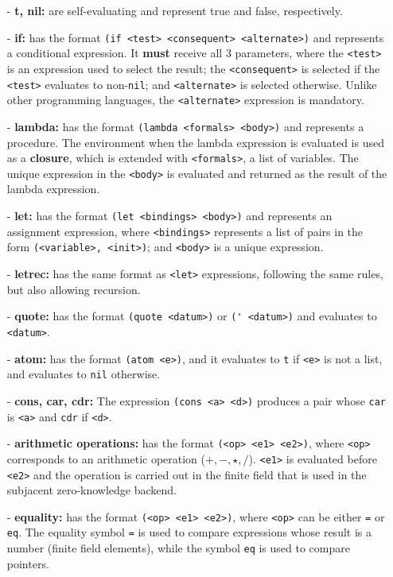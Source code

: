 \documentclass[10pt, english]{article}
\begin{document}
\begin{itemize}
  \item[-] \textbf{t, nil:} are self-evaluating and represent true and false, respectively.
  \item[-] \textbf{if:} has the format \verb|(if <test> <consequent> <alternate>)| and represents a conditional expression. It \textbf{must} receive all 3 parameters, where the \verb|<test>| is an expression used to select the result; the \verb|<consequent>| is selected if the \verb|<test>| evaluates to non-\verb|nil|; and \verb|<alternate>| is selected otherwise. Unlike other programming languages, the \verb|<alternate>| expression is mandatory.
  \item[-] \textbf{lambda:} has the format \verb|(lambda <formals> <body>)| and represents a procedure. The environment when the lambda expression is evaluated is used as a \textbf{closure}, which is extended with \verb|<formals>|, a list of variables. The unique expression in the \verb|<body>| is evaluated and returned as the result of the lambda expression.
  \item[-] \textbf{let:} has the format \verb|(let <bindings> <body>)| and represents an assignment expression, where \verb|<bindings>| represents a list of pairs in the form \verb|(<variable>, <init>)|; and \verb|<body>| is a unique expression.
  \item[-] \textbf{letrec:} has the same format as \verb|<let>| expressions, following the same rules, but also allowing recursion.
  \item[-] \textbf{quote:} has the format \verb|(quote <datum>)| or \verb|(' <datum>)| and evaluates to \verb|<datum>|.
  \item[-] \textbf{atom:} has the format \verb|(atom <e>)|, and it evaluates to \verb|t| if \verb|<e>| is not a list, and evaluates to \verb|nil| otherwise.
  \item[-] \textbf{cons, car, cdr:} The expression \verb|(cons <a> <d>)| produces a pair whose \verb|car| is \verb|<a>| and \verb|cdr| if \verb|<d>|.
  \item[-] \textbf{arithmetic operations:} has the format \verb|(<op> <e1> <e2>)|, where \verb|<op>| corresponds to an arithmetic operation ($+, -, \star, \slash$). \verb|<e1>| is evaluated before \verb|<e2>| and the operation is carried out in the finite field that is used in the subjacent zero-knowledge backend.
  \item[-] \textbf{equality:} has the format \verb|(<op> <e1> <e2>)|, where \verb|<op>| can be either \verb|=| or \verb|eq|. The equality symbol \verb|=| is used to compare expressions whose result is a number (finite field elements), while the symbol \verb|eq| is used to compare pointers.

\end{itemize}
\end{document}
